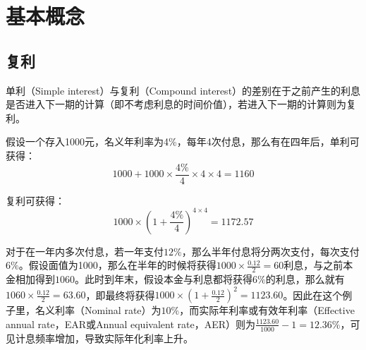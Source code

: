 \documentclass[11pt]{article}
\begin{document}
\maketitle
\tableofcontents

\section{基本概念}

\subsection{复利}

单利（Simple interest）与复利（Compound interest）的差别在于之前产生的利息是否进入下一期的计算（即不考虑利息的时间价值），若进入下一期的计算则为复利。
\begin{example}
    假设一个存入1000元，名义年利率为4\%，每年4次付息，那么有在四年后，单利可获得：
    \begin{equation*}
        1000 + 1000 \times \frac{4\%}{4} \times 4 \times 4 = 1160 
    \end{equation*}

    复利可获得：
    \begin{equation*}
        1000 \times ( 1 + \frac{4\%}{4})^{4 \times 4} = 1172.57
    \end{equation*}
\end{example}

对于在一年内多次付息，若一年支付$12\%$，那么半年付息将分两次支付，每次支付$6\%$。假设面值为1000，那么在半年的时候将获得$1000 \times \frac{0.12}{2} = 60$利息，与之前本金相加得到$1060$。此时到年末，假设本金与利息都将获得$6\%$的利息，那么就有$1060 \times \frac{0.12}{2} = 63.60$，即最终将获得$1000 \times (1+\frac{0.12}{2})^2 = 1123.60$。因此在这个例子里，名义利率（Nominal rate）为$10\%$，而实际年利率或有效年利率（Effective annual rate，EAR或Annual equivalent rate，AER）则为$\frac{1123.60}{1000}-1 = 12.36\%$，可见计息频率增加，导致实际年化利率上升。
\end{document}
